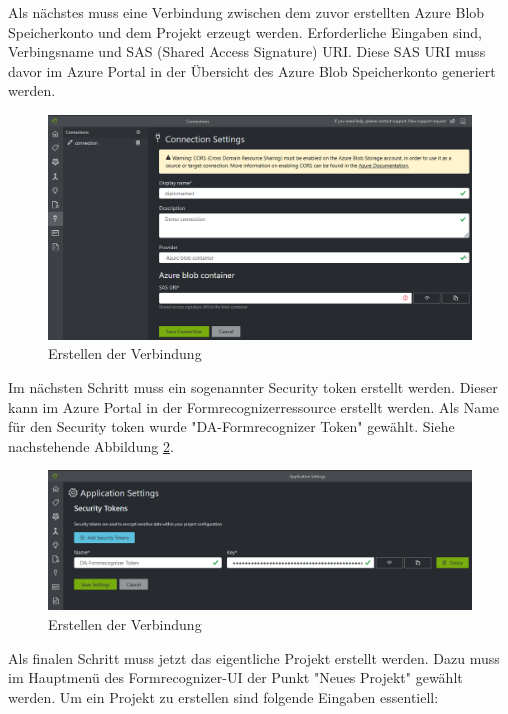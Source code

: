 Als nächstes muss eine Verbindung zwischen dem zuvor erstellten Azure Blob Speicherkonto und dem Projekt erzeugt werden. Erforderliche Eingaben sind, Verbingsname
und SAS (Shared Access Signature) URI. Diese SAS URI muss davor im Azure Portal in der Übersicht des Azure Blob Speicherkonto generiert werden.

\begin{figure}[h]
    \centering
    \includegraphics[scale=0.5]{sections/cloud-computing/images/formrecognizer-blob-connection.PNG}
    \caption{Erstellen der Verbindung}
    \label{fig:formrecognizer-blob-connection}
\end{figure}

Im nächsten Schritt muss ein sogenannter Security token erstellt werden. Dieser kann im Azure Portal in der Formrecognizerressource erstellt werden.
Als Name für den Security token wurde "DA-Formrecognizer Token" gewählt. Siehe nachstehende Abbildung \ref{fig:formrecognizer-security-token}.

\begin{figure}[h]
    \centering
    \includegraphics[scale=0.5]{sections/cloud-computing/images/formrecognizer-security-token.PNG}
    \caption{Erstellen der Verbindung}
    \label{fig:formrecognizer-security-token}
\end{figure}

Als finalen Schritt muss jetzt das eigentliche Projekt erstellt werden. Dazu muss im Hauptmenü des Formrecognizer-UI der Punkt "Neues Projekt"
gewählt werden. Um ein Projekt zu erstellen sind folgende Eingaben essentiell: 

